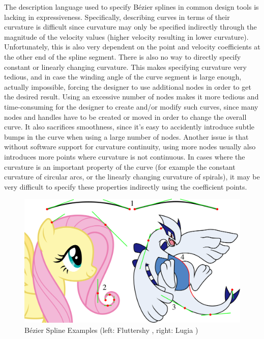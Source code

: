 \documentclass[a4paper]{article}
\begin{document}
				The description language used to specify Bézier splines in common design tools is lacking in expressiveness. Specifically, describing curves in terms of their curvature is difficult since curvature may only be specified indirectly through the magnitude of the velocity values (higher velocity resulting in lower curvature). Unfortunately, this is also very dependent on the point and velocity coefficients at the other end of the spline segment. There is also no way to directly specify constant or linearly changing curvature. This makes specifying curvature very tedious, and in case the winding angle of the curve segment is large enough, actually impossible, forcing the designer to use additional nodes in order to get the desired result. Using an excessive number of nodes makes it more tedious and time-consuming for the designer to create and/or modify such curves, since many nodes and handles have to be created or moved in order to change the overall curve. It also sacrifices smoothness, since it's easy to accidently introduce subtle bumps in the curve when using a large number of nodes. Another issue is that without software support for curvature continuity, using more nodes usually also introduces more points where curvature is not continuous. In cases where the curvature is an important property of the curve (for example the constant curvature of circular arcs, or the linearly changing curvature of spirals), it may be very difficult to specify these properties indirectly using the coefficient points.

				\begin{figure}[htbp]
					\centering
					\includegraphics[width=\textwidth]{content/output/examples_bezier.pdf}
					\caption{Bézier Spline Examples (left: Fluttershy \cite{fluttershy}, right: Lugia \cite{lugia})}
					\label{figure:examples_bézier}
				\end{figure}
\end{document}
